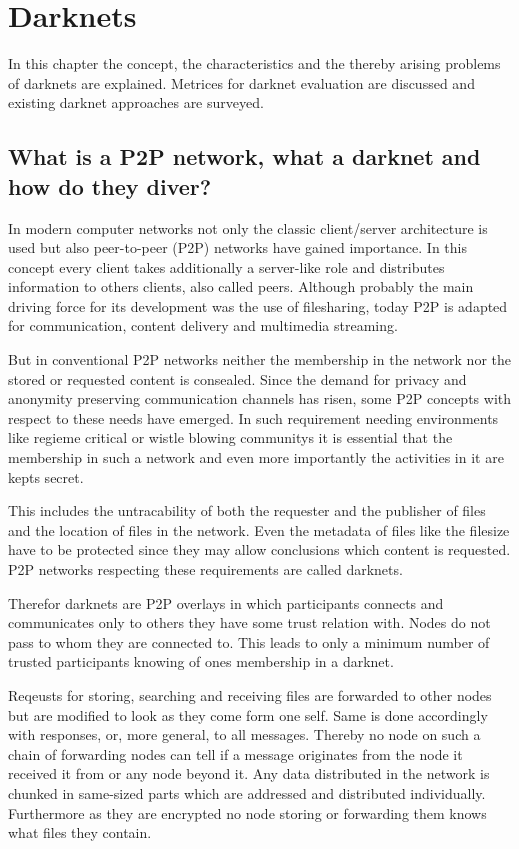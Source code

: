 \chapter{Darknets}

In this chapter the concept, the characteristics and the thereby arising problems of darknets are explained. Metrices for darknet evaluation are discussed and existing darknet approaches are surveyed.

\section{What is a P2P network, what a darknet and how do they diver?}

In modern computer networks not only the classic client/server architecture is used but also peer-to-peer (P2P) networks have gained importance. In this concept every client takes additionally a server-like role and distributes information to others clients, also called peers. Although probably the main driving force for its development was the use of filesharing, today P2P is adapted for communication, content delivery and multimedia streaming.

But in conventional P2P networks neither the membership in the network nor the stored or requested content is consealed. Since the demand for privacy and anonymity preserving communication channels has risen, some P2P concepts with respect to these needs have emerged. In such requirement needing environments like regieme critical or wistle blowing communitys it is essential that the membership in such a network and even more importantly the activities in it are kepts secret.

This includes the untracability of both the requester and the publisher of files and the location of files in the network. Even the metadata of files like the filesize have to be protected since they may allow conclusions which content is requested. P2P networks respecting these requirements are called darknets.

Therefor darknets are P2P overlays in which participants connects and communicates only to others they have some trust relation with. Nodes do not pass to whom they are connected to. This leads to only a minimum number of trusted participants knowing of ones membership in a darknet. 

Reqeusts for storing, searching and receiving files are forwarded to other nodes but are modified to look as they come form one self. Same is done accordingly with responses, or, more general, to all messages. Thereby no node on such a chain of forwarding nodes can tell if a message originates from the node it received it from or any node beyond it. Any data distributed in the network is chunked in same-sized parts which are addressed and distributed individually. Furthermore as they are encrypted no node storing or forwarding them knows what files they contain.


